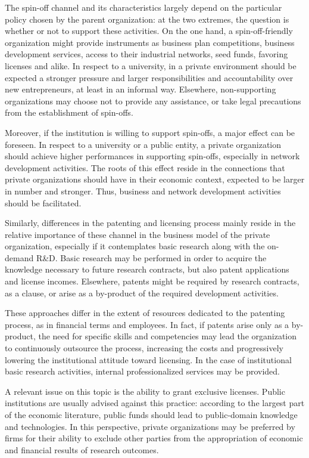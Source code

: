The spin-off channel and its characteristics largely depend on the particular policy chosen by the parent organization: at the two extremes, the question is whether or not to support these activities. On the one hand, a spin-off-friendly organization might provide instruments as business plan competitions, business development services, access to their industrial networks, seed funds, favoring licenses and alike. In respect to a university, in a private environment should be expected a stronger pressure and larger responsibilities and accountability over new entrepreneurs, at least in an informal way. Elsewhere, non-supporting organizations may choose not to provide any assistance, or take legal precautions from the establishment of spin-offs.

Moreover, if the institution is willing to support spin-offs, a major effect can be foreseen. In respect to a university or a public entity, a private organization should achieve higher performances in supporting spin-offs, especially in network development activities. The roots of this effect reside in the connections that private organizations should have in their economic context, expected to be larger in number and stronger. Thus, business and network development activities should be facilitated.

Similarly, differences in the patenting and licensing process mainly reside in the relative importance of these channel in the business model of the private organization, especially if it contemplates basic research along with the on-demand R\&D. Basic research may be performed in order to acquire the knowledge necessary to future research contracts, but also patent applications and license incomes. Elsewhere, patents might be required by research contracts, as a clause, or arise as a by-product of the required development activities.

These approaches differ in the extent of resources dedicated to the patenting process, as in financial terms and employees. In fact, if patents arise only as a by-product, the need for specific skills and competencies may lead the organization to continuously outsource the process, increasing the costs and progressively lowering the institutional attitude toward licensing. In the case of institutional basic research activities, internal professionalized services may be provided.

A relevant issue on this topic is the ability to grant exclusive licenses. Public institutions are usually advised against this practice: according to the largest part of the economic literature, public funds should lead to public-domain knowledge and technologies. In this perspective, private organizations may be preferred by firms for their ability to exclude other parties from the appropriation of economic and financial results of research outcomes.

